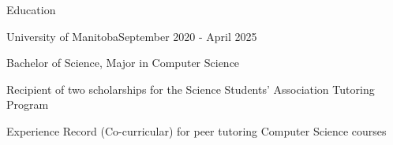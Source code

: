 \begin{resume_section}{Education}
    \begin{resume_subsection}{University of Manitoba}{September 2020 - April 2025}
        \begin{subitems}
            \item Bachelor of Science, Major in Computer Science
            \item Recipient of two scholarships for the Science Students' Association Tutoring Program
            \item Experience Record (Co-curricular) for peer tutoring Computer Science courses
        \end{subitems}
    \end{resume_subsection}
\end{resume_section}

